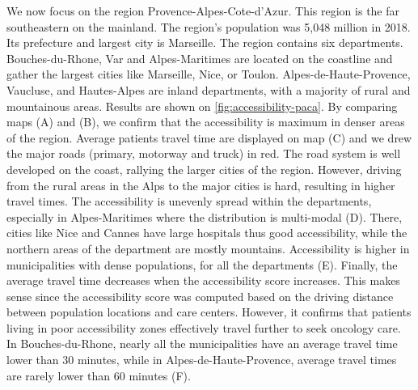 We now focus on the region Provence-Alpes-Cote-d'Azur. This region is the far southeastern on the mainland. The region's population was 5,048 million in 2018. Its prefecture and largest city is Marseille. The region contains six departments. Bouches-du-Rhone, Var and Alpes-Maritimes are located on the coastline and gather the largest cities like Marseille, Nice, or Toulon. Alpes-de-Haute-Provence, Vaucluse, and Hautes-Alpes are inland departments, with a majority of rural and mountainous areas. Results are shown on \cref{fig:accessibility-paca}. By comparing maps (A) and (B), we confirm that the accessibility is maximum in denser areas of the region. Average patients travel time are displayed on map (C) and we drew the major roads (primary, motorway and truck) in red. The road system is well developed on the coast, rallying the larger cities of the region. However, driving from the rural areas in the Alps to the major cities is hard, resulting in higher travel times. The accessibility is unevenly spread within the departments, especially in Alpes-Maritimes where the distribution is multi-modal (D). There, cities like Nice and Cannes have large hospitals thus good accessibility, while the northern areas of the department are mostly mountains. Accessibility is higher in municipalities with dense populations, for all the departments (E). Finally, the average travel time decreases when the accessibility score increases. This makes sense since the accessibility score was computed based on the driving distance between population locations and care centers. However, it confirms that patients living in poor accessibility zones effectively travel further to seek oncology care. In Bouches-du-Rhone, nearly all the municipalities have an average travel time lower than 30 minutes, while in Alpes-de-Haute-Provence, average travel times are rarely lower than 60 minutes (F).

